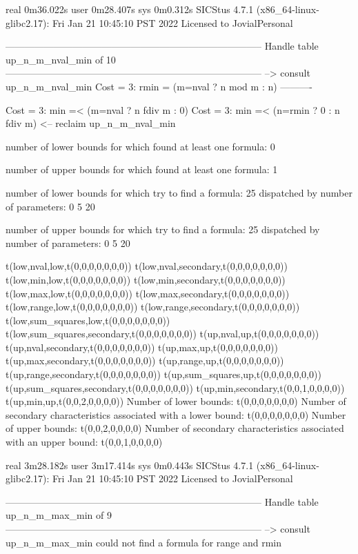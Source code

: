 real	0m36.022s
user	0m28.407s
sys	0m0.312s
SICStus 4.7.1 (x86_64-linux-glibc2.17): Fri Jan 21 10:45:10 PST 2022
Licensed to JovialPersonal


--------------------------------------------------------------------------------
Handle table up_n_m_nval_min of 10
--------------------------------------------------------------------------------
--> consult up_n_m_nval_min
Cost =  3:  rmin = (m=nval ? n mod m : n)
----------

Cost =  3:  min =< (m=nval ? n fdiv m : 0)
Cost =  3:  min =< (n=rmin ? 0 : n fdiv m)
<-- reclaim up_n_m_nval_min

number of lower bounds for which found at least one formula: 0

number of upper bounds for which found at least one formula: 1

number of lower bounds for which try to find a formula: 25
dispatched by number of parameters: 0  5  20

number of upper bounds for which try to find a formula: 25
dispatched by number of parameters: 0  5  20

t(low,nval,low,t(0,0,0,0,0,0,0))
t(low,nval,secondary,t(0,0,0,0,0,0,0))
t(low,min,low,t(0,0,0,0,0,0,0))
t(low,min,secondary,t(0,0,0,0,0,0,0))
t(low,max,low,t(0,0,0,0,0,0,0))
t(low,max,secondary,t(0,0,0,0,0,0,0))
t(low,range,low,t(0,0,0,0,0,0,0))
t(low,range,secondary,t(0,0,0,0,0,0,0))
t(low,sum_squares,low,t(0,0,0,0,0,0,0))
t(low,sum_squares,secondary,t(0,0,0,0,0,0,0))
t(up,nval,up,t(0,0,0,0,0,0,0))
t(up,nval,secondary,t(0,0,0,0,0,0,0))
t(up,max,up,t(0,0,0,0,0,0,0))
t(up,max,secondary,t(0,0,0,0,0,0,0))
t(up,range,up,t(0,0,0,0,0,0,0))
t(up,range,secondary,t(0,0,0,0,0,0,0))
t(up,sum_squares,up,t(0,0,0,0,0,0,0))
t(up,sum_squares,secondary,t(0,0,0,0,0,0,0))
t(up,min,secondary,t(0,0,1,0,0,0,0))
t(up,min,up,t(0,0,2,0,0,0,0))
Number of lower bounds:                                             t(0,0,0,0,0,0,0)
Number of secondary characteristics associated with a lower bound:  t(0,0,0,0,0,0,0)
Number of upper bounds:                                             t(0,0,2,0,0,0,0)
Number of secondary characteristics associated with an upper bound: t(0,0,1,0,0,0,0)

real	3m28.182s
user	3m17.414s
sys	0m0.443s
SICStus 4.7.1 (x86_64-linux-glibc2.17): Fri Jan 21 10:45:10 PST 2022
Licensed to JovialPersonal


--------------------------------------------------------------------------------
Handle table up_n_m_max_min of 9
--------------------------------------------------------------------------------
--> consult up_n_m_max_min
could not find a formula for range and rmin

